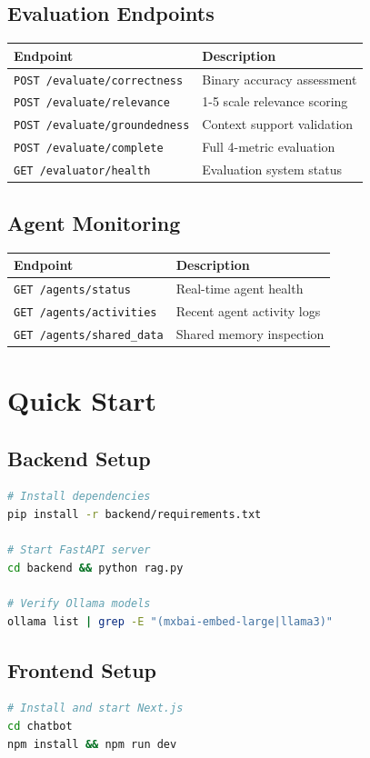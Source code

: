 \documentclass[12pt,a4paper]{article}
\newcommand{\endpoint}[2]{\texttt{#1} & #2 \\}
\begin{document}
\subsection{Evaluation Endpoints}
\begin{tabular}{|l|l|}
\hline
\textbf{Endpoint} & \textbf{Description} \\
\hline
\endpoint{POST /evaluate/correctness}{Binary accuracy assessment}
\endpoint{POST /evaluate/relevance}{1-5 scale relevance scoring}
\endpoint{POST /evaluate/groundedness}{Context support validation}
\endpoint{POST /evaluate/complete}{Full 4-metric evaluation}
\endpoint{GET /evaluator/health}{Evaluation system status}
\hline
\end{tabular}

\subsection{Agent Monitoring}
\begin{tabular}{|l|l|}
\hline
\textbf{Endpoint} & \textbf{Description} \\
\hline
\endpoint{GET /agents/status}{Real-time agent health}
\endpoint{GET /agents/activities}{Recent agent activity logs}
\endpoint{GET /agents/shared\_data}{Shared memory inspection}
\hline
\end{tabular}

\section{Quick Start}

\subsection{Backend Setup}
\begin{codebox}
\begin{lstlisting}[language=bash]
# Install dependencies
pip install -r backend/requirements.txt

# Start FastAPI server
cd backend && python rag.py

# Verify Ollama models
ollama list | grep -E "(mxbai-embed-large|llama3)"
\end{lstlisting}
\end{codebox}

\subsection{Frontend Setup}
\begin{codebox}
\begin{lstlisting}[language=bash]
# Install and start Next.js
cd chatbot
npm install && npm run dev
\end{lstlisting}
\end{codebox}
\end{document}
